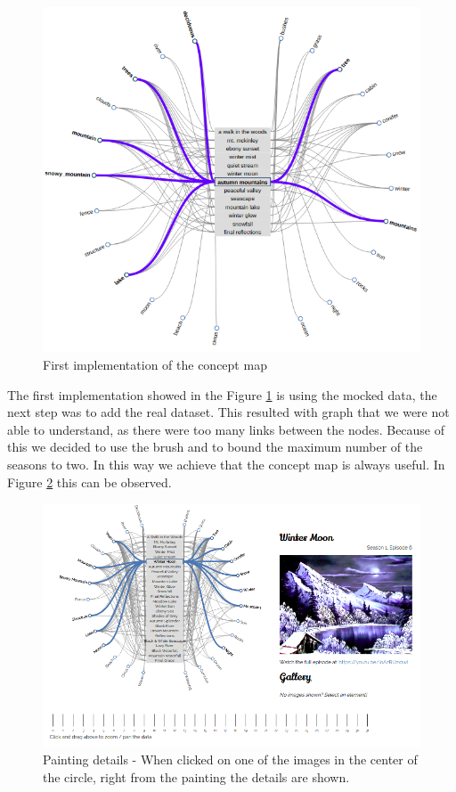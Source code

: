\documentclass[a4paper]{tufte-book}
\begin{document}
\begin{figure}
	\includegraphics{Images/firstImplementation.png}
	\caption{First implementation of the concept map}
	\label{fig:concept2}
\end{figure}

The first implementation showed in the Figure  \ref{fig:concept2} is using the mocked data, the next step was to add the real dataset. This resulted with graph that we were not able to understand, as there were too many links between the nodes. Because of this we decided to use the brush and to bound the maximum number of the seasons to two. In this way we achieve that the concept map is always useful. In Figure \ref{fig:concept3} this can be observed. \\



\begin{figure}[!h]
	\includegraphics{Images/detailsPainting.png}
	\caption{Painting details - When clicked on one of the images in the center of the circle, right from the painting the details are shown. }
	\label{fig:concept3}
\end{figure}
\end{document}
